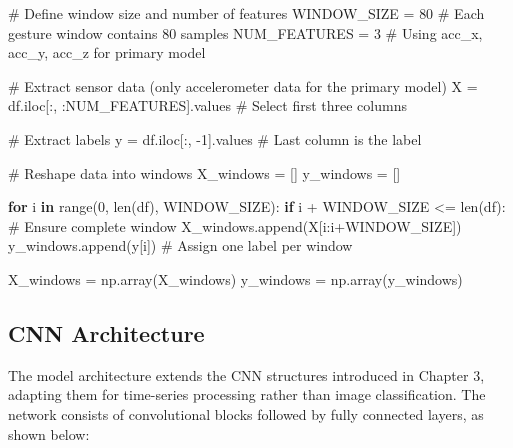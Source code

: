 \documentclass[
  9pt,
  letterpaper,
  abstract,
  titlepage]{scrbook}
\newenvironment{Shaded}{\begin{snugshade}}{\end{snugshade}}
\newcommand{\BuiltInTok}[1]{\textcolor[rgb]{0.00,0.23,0.31}{#1}}
\newcommand{\CommentTok}[1]{\textcolor[rgb]{0.37,0.37,0.37}{#1}}
\newcommand{\ControlFlowTok}[1]{\textcolor[rgb]{0.00,0.23,0.31}{\textbf{#1}}}
\newcommand{\DecValTok}[1]{\textcolor[rgb]{0.68,0.00,0.00}{#1}}
\newcommand{\KeywordTok}[1]{\textcolor[rgb]{0.00,0.23,0.31}{\textbf{#1}}}
\newcommand{\NormalTok}[1]{\textcolor[rgb]{0.00,0.23,0.31}{#1}}
\newcommand{\OperatorTok}[1]{\textcolor[rgb]{0.37,0.37,0.37}{#1}}
\begin{document}
\begin{Shaded}
\begin{Highlighting}[]
\CommentTok{\# Define window size and number of features}
\NormalTok{WINDOW\_SIZE }\OperatorTok{=} \DecValTok{80}  \CommentTok{\# Each gesture window contains 80 samples}
\NormalTok{NUM\_FEATURES }\OperatorTok{=} \DecValTok{3}  \CommentTok{\# Using acc\_x, acc\_y, acc\_z for primary model}

\CommentTok{\# Extract sensor data (only accelerometer data for the primary model)}
\NormalTok{X }\OperatorTok{=}\NormalTok{ df.iloc[:, :NUM\_FEATURES].values  }\CommentTok{\# Select first three columns}

\CommentTok{\# Extract labels}
\NormalTok{y }\OperatorTok{=}\NormalTok{ df.iloc[:, }\OperatorTok{{-}}\DecValTok{1}\NormalTok{].values  }\CommentTok{\# Last column is the label}

\CommentTok{\# Reshape data into windows}
\NormalTok{X\_windows }\OperatorTok{=}\NormalTok{ []}
\NormalTok{y\_windows }\OperatorTok{=}\NormalTok{ []}

\ControlFlowTok{for}\NormalTok{ i }\KeywordTok{in} \BuiltInTok{range}\NormalTok{(}\DecValTok{0}\NormalTok{, }\BuiltInTok{len}\NormalTok{(df), WINDOW\_SIZE):}
    \ControlFlowTok{if}\NormalTok{ i }\OperatorTok{+}\NormalTok{ WINDOW\_SIZE }\OperatorTok{\textless{}=} \BuiltInTok{len}\NormalTok{(df):  }\CommentTok{\# Ensure complete window}
\NormalTok{        X\_windows.append(X[i:i}\OperatorTok{+}\NormalTok{WINDOW\_SIZE])}
\NormalTok{        y\_windows.append(y[i])  }\CommentTok{\# Assign one label per window}

\NormalTok{X\_windows }\OperatorTok{=}\NormalTok{ np.array(X\_windows)}
\NormalTok{y\_windows }\OperatorTok{=}\NormalTok{ np.array(y\_windows)}
\end{Highlighting}
\end{Shaded}

\subsection{CNN Architecture}\label{cnn-architecture-1}

The model architecture extends the CNN structures introduced in Chapter
3, adapting them for time-series processing rather than image
classification. The network consists of convolutional blocks followed by
fully connected layers, as shown below:
\end{document}
